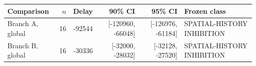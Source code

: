 \begin{tabular}{lrrrrl}
\toprule
Comparison & $n$ & Delay & 90\% CI & 95\% CI & Frozen class \\
\midrule
Branch A, global & 16 & -92544 & [-120960, -66048] & [-126976, -61184] & SPATIAL-HISTORY INHIBITION \\
Branch B, global & 16 & -30336 & [-32000, -28032] & [-32128, -27520] & SPATIAL-HISTORY INHIBITION \\
\bottomrule
\end{tabular}
